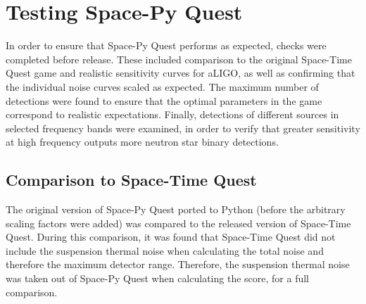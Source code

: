\documentclass{article}
\begin{document}

\clearpage
\section{Testing Space-Py Quest}
\label{sec:testing}
In order to ensure that Space-Py Quest performs as expected, checks were completed before release. These included comparison to the original Space-Time Quest game and realistic sensitivity curves for aLIGO, as well as confirming that the individual noise curves scaled as expected. The maximum number of detections were found to ensure that the optimal parameters in the game correspond to realistic expectations. Finally, detections of different sources in selected frequency bands were examined, in order to verify that greater sensitivity at high frequency outputs more neutron star binary detections.  
\label{sec:mcmc}
\subsection{Comparison to Space-Time Quest}

The original version of Space-Py Quest ported to Python (before the arbitrary scaling factors were added) was compared to the released version of Space-Time Quest. During this comparison, it was found that Space-Time Quest did not include the suspension thermal noise when calculating the total noise and therefore the maximum detector range. Therefore, the suspension thermal noise was taken out of Space-Py Quest when calculating the score, for a full comparison.
\end{document}

